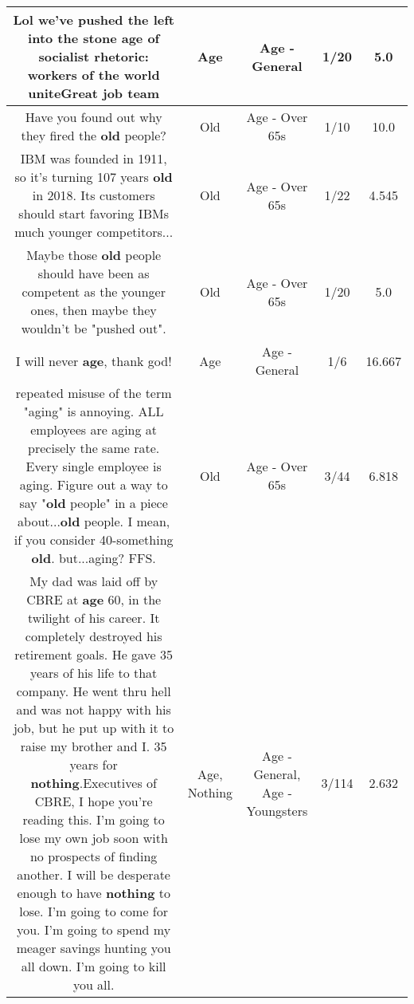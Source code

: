 \documentclass[11pt]{article}
\newlength\mylength
\begin{document}
\begin{center}
\begin{longtable}{|C{.65\mylength}|C{.30\mylength}|C{.12\mylength}|C{.12\mylength}|C{.12\mylength}|}
  \small Lol we've pushed the left into the stone \textbf{age} of socialist rhetoric: workers of the world uniteGreat job team\normalsize   & Age & Age - General & 1/20 & 5.0 \\  \hline
  \small Have you found out why they fired the \textbf{old} people?\normalsize   & Old & Age - Over 65s & 1/10 & 10.0 \\  \hline
  \small IBM was founded in 1911, so it's turning 107 years \textbf{old} in 2018. Its customers should start favoring IBMs much younger competitors...\normalsize   & Old & Age - Over 65s & 1/22 & 4.545 \\  \hline
  \small Maybe those \textbf{old} people should have been as competent as the younger ones, then maybe they wouldn't be "pushed out".\normalsize   & Old & Age - Over 65s & 1/20 & 5.0 \\  \hline
  \small I will never \textbf{age}, thank god!\normalsize   & Age & Age - General & 1/6 & 16.667 \\  \hline
  \small repeated misuse of the term "aging" is annoying. ALL employees are aging at precisely the same rate. Every single employee is aging.  Figure out a way to say "\textbf{old} people" in a piece about...\textbf{old} people. I mean, if you consider 40-something \textbf{old}. but...aging? FFS.\normalsize   & Old & Age - Over 65s & 3/44 & 6.818 \\  \hline
  \small My dad was laid off by CBRE at \textbf{age} 60, in the twilight of his career. It completely destroyed his retirement goals. He gave 35 years of his life to that company. He went thru hell and was not happy with his job, but he put up with it to raise my brother and I. 35 years for \textbf{nothing}.Executives of CBRE, I hope you're reading this. I'm going to lose my own job soon with no prospects of finding another. I will be desperate enough to have \textbf{nothing} to lose. I'm going to come for you. I'm going to spend my meager savings hunting you all down. I'm going to kill you all.\normalsize   & Age, Nothing & Age - General, Age - Youngsters & 3/114 & 2.632 \\  \hline

\end{longtable}
\end{center}
\end{document}
